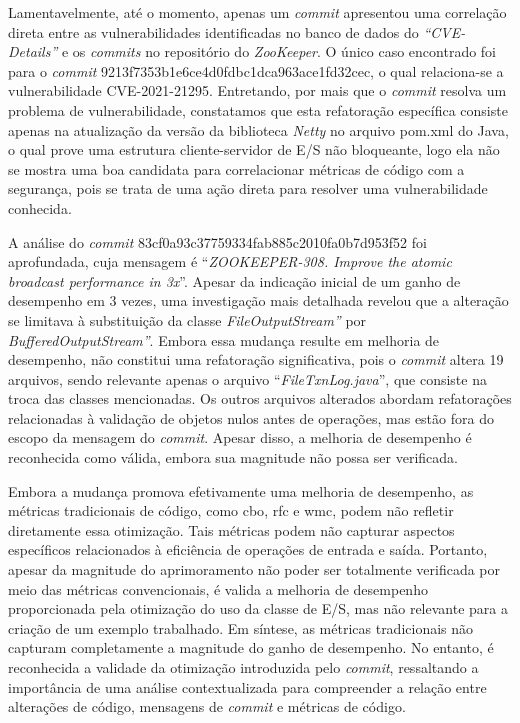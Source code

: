 Lamentavelmente, até o momento, apenas um \textit{commit} apresentou uma correlação direta entre as vulnerabilidades identificadas no banco de dados do \textit{``CVE-Details''} e os \textit{commits} no repositório do \textit{ZooKeeper}. O único caso encontrado foi para o \textit{commit} 9213f7353b1e6ce4d0fdbc1dca963ace1fd32cec, o qual relaciona-se a vulnerabilidade CVE-2021-21295. Entretando, por mais que o \textit{commit} resolva um problema de vulnerabilidade, constatamos que esta refatoração específica consiste apenas na atualização da versão da biblioteca \textit{Netty} no arquivo pom.xml do Java, o qual prove uma estrutura cliente-servidor de E/S não bloqueante, logo ela não se mostra uma boa candidata para correlacionar métricas de código com a segurança, pois se trata de uma ação direta para resolver uma vulnerabilidade conhecida.

A análise do \textit{commit} 83cf0a93c37759334fab885c2010fa0b7d953f52 foi aprofundada, cuja mensagem é ``\textit{ZOOKEEPER-308. Improve the atomic broadcast performance in 3x}''. Apesar da indicação inicial de um ganho de desempenho em 3 vezes, uma investigação mais detalhada revelou que a alteração se limitava à substituição da classe \textit{FileOutputStream''} por \textit{BufferedOutputStream''}. Embora essa mudança resulte em melhoria de desempenho, não constitui uma refatoração significativa, pois o \textit{commit} altera 19 arquivos, sendo relevante apenas o arquivo ``\textit{FileTxnLog.java}'', que consiste na troca das classes mencionadas. Os outros arquivos alterados abordam refatorações relacionadas à validação de objetos nulos antes de operações, mas estão fora do escopo da mensagem do \textit{commit}. Apesar disso, a melhoria de desempenho é reconhecida como válida, embora sua magnitude não possa ser verificada.

Embora a mudança promova efetivamente uma melhoria de desempenho, as métricas tradicionais de código, como \gls{cbo}, \gls{rfc} e \gls{wmc}, podem não refletir diretamente essa otimização. Tais métricas podem não capturar aspectos específicos relacionados à eficiência de operações de entrada e saída. Portanto, apesar da magnitude do aprimoramento não poder ser totalmente verificada por meio das métricas convencionais, é valida a melhoria de desempenho proporcionada pela otimização do uso da classe de E/S, mas não relevante para a criação de um exemplo trabalhado. Em síntese, as métricas tradicionais não capturam completamente a magnitude do ganho de desempenho. No entanto, é reconhecida a validade da otimização introduzida pelo \textit{commit}, ressaltando a importância de uma análise contextualizada para compreender a relação entre alterações de código, mensagens de \textit{commit} e métricas de código.

